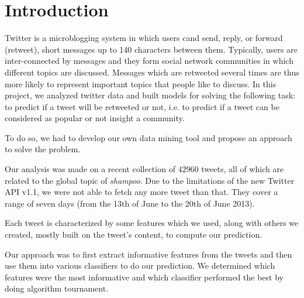 \section{Introduction}

Twitter is a microblogging system in which users cand send, reply, or forward
(retweet), short messages up to 140 characters between them. Typically, users
are inter-connected by messages and they form social network communities in
which different topics are discussed. Messages which are retweeted several times
are thus more likely to represent important topics that people like to discuss.
In this project, we analyzed twitter data and built models for solving 
the following task: to predict if a tweet will be retweeted or not, i.e. to 
predict if a tweet can be considered as popular or not insight a community.

To do so, we had to develop our own data mining tool and propose an
approach to solve the problem.

Our analysis was made on a recent collection of $42960$ tweets, all of which 
are related to the global topic of \textit{shampoo}. Due to the limitations of 
the new Twitter API v1.1, we were not able to fetch any more tweet than that. 
They cover a range of seven days (from the 13th of June to the 20th of June 
2013).

Each tweet is characterized by some features which we used, along with others 
we created, mostly built on the tweet's content, to compute our prediction.

Our approach was to first extract informative features from the tweets and then 
use them into various classifiers to do our prediction. We determined which 
features were the most informative and which classifier performed the best by 
doing algorithm tournament.